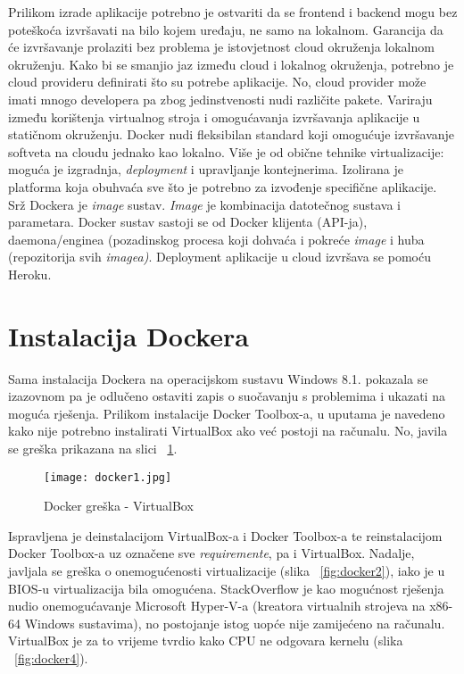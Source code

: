 Prilikom izrade aplikacije potrebno je ostvariti da se frontend i backend mogu bez poteškoća izvršavati na bilo kojem uređaju, ne samo na lokalnom. Garancija da će izvršavanje prolaziti bez problema je istovjetnost cloud okruženja lokalnom okruženju. Kako bi se smanjio jaz između cloud i lokalnog okruženja, potrebno je cloud provideru definirati što su potrebe aplikacije. No, cloud provider može imati mnogo developera pa zbog jedinstvenosti nudi različite pakete. Variraju između korištenja virtualnog stroja i omogućavanja izvršavanja aplikacije u statičnom okruženju. Docker nudi fleksibilan standard koji omogućuje izvršavanje softveta na cloudu jednako kao lokalno. Više je od obične tehnike virtualizacije: moguća je izgradnja, \textit{deployment} i upravljanje kontejnerima. Izolirana je platforma koja obuhvaća sve što je potrebno za izvođenje specifične aplikacije. Srž Dockera je \textit{image} sustav. \textit{Image} je kombinacija datotečnog sustava i parametara. Docker sustav sastoji se od Docker klijenta (API-ja), daemona/enginea (pozadinskog procesa koji dohvaća i pokreće \textit{image} i huba (repozitorija svih \textit{imagea)}.\newline
Deployment aplikacije u cloud izvršava se pomoću Heroku. 

\section{Instalacija Dockera}
Sama instalacija Dockera na operacijskom sustavu Windows 8.1. pokazala se izazovnom pa je odlučeno ostaviti zapis o suočavanju s problemima i ukazati na moguća rješenja. \newline
Prilikom instalacije Docker Toolbox-a, u uputama je navedeno kako nije potrebno instalirati VirtualBox ako već postoji na računalu. No, javila se greška prikazana na slici ~\ref{fig:docker1}.\pagebreak

\begin{figure}[!htb]
	\centering
	\texttt{[image: docker1.jpg]}
	\caption{Docker greška - VirtualBox}
	\label{fig:docker1}
\end{figure}

Ispravljena je deinstalacijom VirtualBox-a i Docker Toolbox-a te reinstalacijom Docker Toolbox-a uz označene sve \textit{requiremente}, pa i VirtualBox.\newline
Nadalje, javljala se greška o onemogućenosti virtualizacije (slika ~\ref{fig:docker2}), iako je u BIOS-u virtualizacija bila omogućena. StackOverflow je kao mogućnost rješenja nudio onemogućavanje Microsoft Hyper-V-a (kreatora virtualnih strojeva na x86-64 Windows sustavima), no postojanje istog uopće nije zamijećeno na računalu.  VirtualBox je za to vrijeme tvrdio kako CPU ne odgovara kernelu (slika ~\ref{fig:docker4}).

